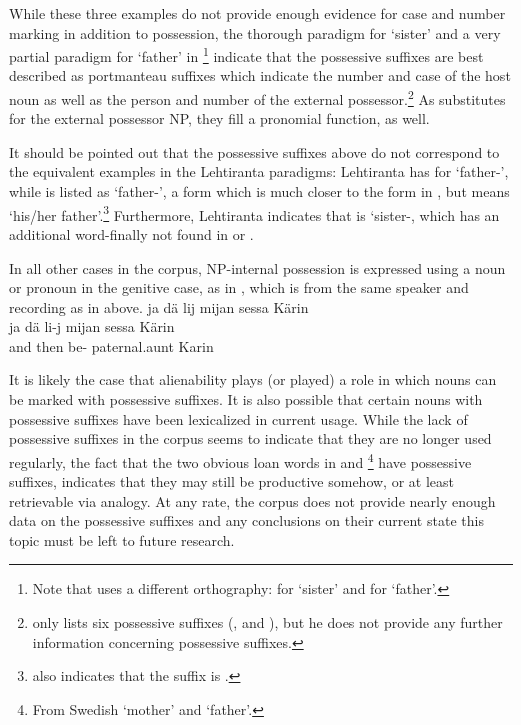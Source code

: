 While these three examples do not provide enough evidence for case and number marking in addition to possession, the thorough paradigm for  ‘sister’ and a very partial paradigm for  ‘father’ in \citet[158-159]{Lehtiranta1992}\footnote{Note that \citet{Lehtiranta1992} uses a different orthography:  for ‘sister’ and  for ‘father’.} indicate that the possessive suffixes are best described as portmanteau suffixes which indicate the number and case of the host noun as well as the person and number of the external possessor.\footnote{\citet[110]{Lagercrantz1926} only lists six possessive suffixes (,  and ), but he does not provide any further information concerning possessive suffixes.}
As substitutes for the external possessor NP, they fill a pronomial function, as well. %

It should be pointed out that the possessive suffixes above do not correspond to the equivalent examples in the Lehtiranta paradigms: Lehtiranta has  for ‘father-’, while  is listed as ‘father-’, a form which is much closer to the form in , but means ‘his/her father’.\footnote{\citet[110]{Lagercrantz1926} also indicates that the  suffix is .} 
Furthermore, Lehtiranta indicates that  is ‘sister-, which has an additional  word-finally not found in  or . 

In all other cases in the corpus, NP-internal possession is expressed using a noun or pronoun in the genitive case, as in , which is from the same speaker and recording as in  above.
\ea\label{noPossSuffix1}
\glll	ja dä lij mijan sessa Kärin\\
	ja dä li-j mijan sessa Kärin\\
	and then be-  paternal.aunt\BS{} Karin \\\nopagebreak
{}	
\z

It is likely the case that alienability plays (or played) a role in which nouns can be marked with possessive suffixes. It is also possible that certain nouns with possessive suffixes have been lexicalized in current usage. %
While the lack of possessive suffixes in the corpus seems to indicate that they are no longer used regularly, the fact that the two obvious loan words in  and \footnote{From Swedish  ‘mother’ and  ‘father’.} 
have possessive suffixes, indicates that they may still be productive somehow, or at least retrievable via analogy. At any rate, the corpus does not provide nearly enough data on the possessive suffixes and any conclusions on their current state this topic must be left to future research.



%